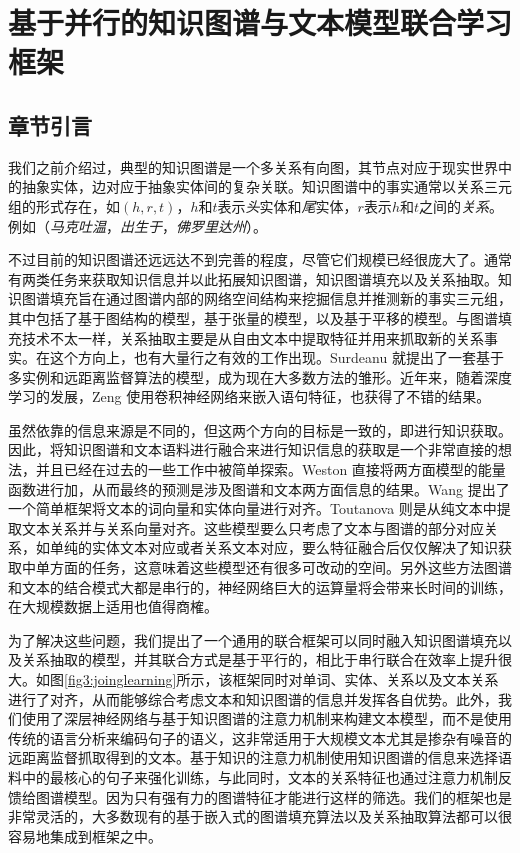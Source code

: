 \chapter{基于并行的知识图谱与文本模型联合学习框架}
\label{cha3:jointlearning}

\section{章节引言}

我们之前介绍过，典型的知识图谱是一个多关系有向图，其节点对应于现实世界中的抽象实体，边对应于抽象实体间的复杂关联。知识图谱中的事实通常以关系三元组的形式存在，如$(h, r, t)$，$h$和$t$表示\emph{头}实体和\emph{尾}实体，$r$表示$h$和$t$之间的\emph{关系}。例如（\emph{马克吐温}，\emph{出生于}，\emph{佛罗里达州}）。

不过目前的知识图谱还远远达不到完善的程度，尽管它们规模已经很庞大了。通常有两类任务来获取知识信息并以此拓展知识图谱，知识图谱填充以及关系抽取。知识图谱填充旨在通过图谱内部的网络空间结构来挖掘信息并推测新的事实三元组，其中包括了基于图结构的模型\cite{lao2010relational,lao2011random}，基于张量的模型\cite{socher2013reasoning, nickel2016holographic}，以及基于平移的模型\cite{bordes2013translating,ji2015knowledge}。与图谱填充技术不太一样，关系抽取主要是从自由文本中提取特征并用来抓取新的关系事实。在这个方向上，也有大量行之有效的工作出现。Surdeanu \cite{surdeanu2012multi}就提出了一套基于多实例和远距离监督算法的模型，成为现在大多数方法的雏形。近年来，随着深度学习的发展，Zeng \cite{zeng2014relation}使用卷积神经网络来嵌入语句特征，也获得了不错的结果。

虽然依靠的信息来源是不同的，但这两个方向的目标是一致的，即进行知识获取。因此，将知识图谱和文本语料进行融合来进行知识信息的获取是一个非常直接的想法，并且已经在过去的一些工作中被简单探索。Weston \cite{weston2013connecting}直接将两方面模型的能量函数进行加，从而最终的预测是涉及图谱和文本两方面信息的结果。Wang \cite{wang2014knowledge}提出了一个简单框架将文本的词向量和实体向量进行对齐。Toutanova \cite{toutanova2015representing} 则是从纯文本中提取文本关系并与关系向量对齐。这些模型要么只考虑了文本与图谱的部分对应关系，如单纯的实体文本对应或者关系文本对应，要么特征融合后仅仅解决了知识获取中单方面的任务，这意味着这些模型还有很多可改动的空间。另外这些方法图谱和文本的结合模式大都是串行的，神经网络巨大的运算量将会带来长时间的训练，在大规模数据上适用也值得商榷。

为了解决这些问题，我们提出了一个通用的联合框架可以同时融入知识图谱填充以及关系抽取的模型，并其联合方式是基于平行的，相比于串行联合在效率上提升很大。如图\ref{fig3:joinglearning}所示，该框架同时对单词、实体、关系以及文本关系进行了对齐，从而能够综合考虑文本和知识图谱的信息并发挥各自优势。此外，我们使用了深层神经网络与基于知识图谱的注意力机制来构建文本模型，而不是使用传统的语言分析来编码句子的语义，这非常适用于大规模文本尤其是掺杂有噪音的远距离监督抓取得到的文本。基于知识的注意力机制使用知识图谱的信息来选择语料中的最核心的句子来强化训练，与此同时，文本的关系特征也通过注意力机制反馈给图谱模型。因为只有强有力的图谱特征才能进行这样的筛选。我们的框架也是非常灵活的，大多数现有的基于嵌入式的图谱填充算法以及关系抽取算法都可以很容易地集成到框架之中。

